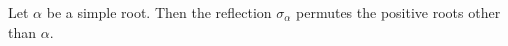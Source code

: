 Let $\alpha$ be a simple root. Then the reflection $\sigma_\alpha$ permutes the positive roots other than $\alpha$.
